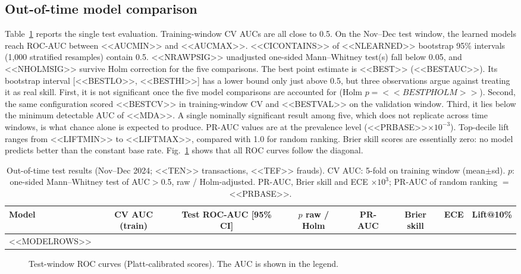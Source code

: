 \documentclass[conference]{IEEEtran}
\begin{document}
\subsection{Out-of-time model comparison}
Table~\ref{tab:models} reports the single test evaluation. Training-window CV AUCs are all close to 0.5. On the Nov--Dec test window, the learned models reach ROC-AUC between <<AUCMIN>> and <<AUCMAX>>. <<CICONTAINS>> of <<NLEARNED>> bootstrap 95\% intervals (1,000 stratified resamples) contain 0.5. <<NRAWPSIG>> unadjusted one-sided Mann--Whitney test(s) fall below 0.05, and <<NHOLMSIG>> survive Holm correction for the five comparisons. The best point estimate is <<BEST>> (<<BESTAUC>>). Its bootstrap interval [<<BESTLO>>, <<BESTHI>>] has a lower bound only just above 0.5, but three observations argue against treating it as real skill. First, it is not significant once the five model comparisons are accounted for (Holm $p=<<BESTPHOLM>>$). Second, the same configuration scored <<BESTCV>> in training-window CV and <<BESTVAL>> on the validation window. Third, it lies below the minimum detectable AUC of <<MDA>>. A single nominally significant result among five, which does not replicate across time windows, is what chance alone is expected to produce. PR-AUC values are at the prevalence level (<<PRBASE>>$\times10^{-3}$). Top-decile lift ranges from <<LIFTMIN>> to <<LIFTMAX>>, compared with 1.0 for random ranking. Brier skill scores are essentially zero: no model predicts better than the constant base rate. Fig.~\ref{fig:roc} shows that all ROC curves follow the diagonal.

\begin{table}[t]
\centering
\caption{Out-of-time test results (Nov--Dec 2024; <<TEN>> transactions, <<TEF>> frauds). CV AUC: 5-fold on training window (mean$\pm$sd). $p$: one-sided Mann--Whitney test of AUC$>$0.5, raw / Holm-adjusted. PR-AUC, Brier skill and ECE $\times10^{3}$; PR-AUC of random ranking $=$ <<PRBASE>>.}\label{tab:models}
\footnotesize
\begin{tabular}{@{}lccccccc@{}}
\toprule
Model & CV AUC (train) & Test ROC-AUC [95\% CI] & $p$ raw / Holm & PR-AUC & Brier skill & ECE & Lift@10\% \\
\midrule
<<MODELROWS>>
\bottomrule
\end{tabular}
\end{table}

\begin{figure}[t]
\centering
{}
\caption{Test-window ROC curves (Platt-calibrated scores). The AUC is shown in the legend.}\label{fig:roc}
\end{figure}
\end{document}
